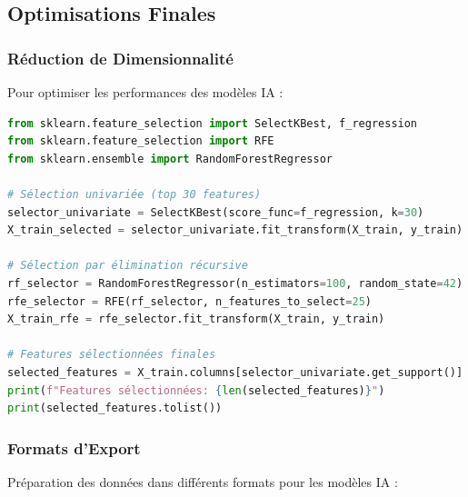 \subsection{Optimisations Finales}
\label{subsec:optimisations_finales}

\subsubsection{Réduction de Dimensionnalité}

Pour optimiser les performances des modèles IA :

\begin{lstlisting}[language=Python,caption=Sélection de Features]
from sklearn.feature_selection import SelectKBest, f_regression
from sklearn.feature_selection import RFE
from sklearn.ensemble import RandomForestRegressor

# Sélection univariée (top 30 features)
selector_univariate = SelectKBest(score_func=f_regression, k=30)
X_train_selected = selector_univariate.fit_transform(X_train, y_train)

# Sélection par élimination récursive
rf_selector = RandomForestRegressor(n_estimators=100, random_state=42)
rfe_selector = RFE(rf_selector, n_features_to_select=25)
X_train_rfe = rfe_selector.fit_transform(X_train, y_train)

# Features sélectionnées finales
selected_features = X_train.columns[selector_univariate.get_support()]
print(f"Features sélectionnées: {len(selected_features)}")
print(selected_features.tolist())
\end{lstlisting}

\subsubsection{Formats d'Export}

Préparation des données dans différents formats pour les modèles IA :

